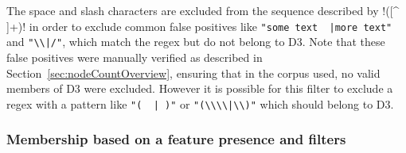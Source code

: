 \begin{description}
The space and slash characters are excluded from the sequence described by \cverb!([^ \\]+)! in order to exclude common false positives like \verb!"some text  |more text"! and \verb!"\\|/"!, which match the regex but do not belong to D3.  Note that these false positives were manually verified as described in Section~\ref{sec:nodeCountOverview}, ensuring that in the corpus used, no valid members of D3 were excluded.  However it is possible for this filter to exclude a regex with a pattern like \verb!"(  | )"! or \verb!"(\\\\|\\)"! which should belong to D3.
\end{description}

\subsubsection{Membership based on a feature presence and filters}
